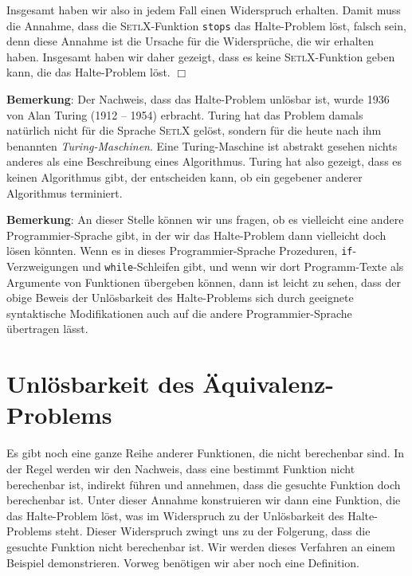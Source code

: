 Insgesamt haben wir also in jedem Fall einen Widerspruch erhalten.  
Damit muss die Annahme, dass die \textsc{SetlX}-Funktion \texttt{stops}
das Halte-Problem l\"{o}st, falsch sein, denn diese Annahme ist die Ursache f\"{u}r die Widerspr\"{u}che, die
wir erhalten haben.  Insgesamt haben wir daher gezeigt, dass es keine \textsc{SetlX}-Funktion
geben kann, die das Halte-Problem l\"{o}st. \hspace*{\fill} $\Box$
\vspace*{0.3cm}

\noindent
\textbf{Bemerkung}:
Der Nachweis, dass das Halte-Problem unl\"{o}sbar ist, wurde 1936 von Alan Turing (1912 -- 1954)
\cite{turing:36} erbracht.  Turing hat das Problem damals nat\"{u}rlich nicht f\"{u}r die Sprache
\textsc{SetlX} gel\"{o}st, sondern f\"{u}r die heute nach ihm benannten \emph{Turing-Maschinen}.  
Eine Turing-Maschine ist abstrakt gesehen nichts anderes als eine Beschreibung eines
Algorithmus.  Turing hat also gezeigt, dass es keinen Algorithmus gibt, der entscheiden
kann, ob ein gegebener anderer Algorithmus terminiert.
\vspace*{0.3cm}

\noindent
\textbf{Bemerkung}:
An dieser Stelle k\"{o}nnen wir uns fragen, ob es vielleicht eine andere Programmier-Sprache
gibt, in der wir das Halte-Problem dann vielleicht doch l\"{o}sen k\"{o}nnten.  
Wenn es in dieses Programmier-Sprache Prozeduren, \texttt{if}-Verzweigungen und
\texttt{while}-Schleifen gibt, und wenn wir dort 
Programm-Texte als Argumente von Funktionen \"{u}bergeben k\"{o}nnen, dann ist leicht zu sehen,
dass der obige Beweis der 
Unl\"{o}sbarkeit des Halte-Problems sich durch geeignete syntaktische Modifikationen auch auf
die andere Programmier-Sprache \"{u}bertragen l\"{a}sst.


\section{Unl\"{o}sbarkeit des \"{A}quivalenz-Problems}
Es gibt noch eine ganze Reihe anderer Funktionen, die nicht berechenbar sind.  In der
Regel werden wir den Nachweis, dass eine bestimmt Funktion nicht berechenbar ist, indirekt f\"{u}hren
und annehmen, dass die gesuchte Funktion doch berechenbar ist.  Unter dieser Annahme
konstruieren wir dann eine Funktion, die das Halte-Problem l\"{o}st, was im Widerspruch zu der Unl\"{o}sbarkeit
des Halte-Problems steht.
Dieser Widerspruch zwingt uns zu der Folgerung, dass die gesuchte Funktion nicht berechenbar ist.
Wir werden dieses Verfahren an einem Beispiel demonstrieren.  Vorweg ben\"{o}tigen wir aber
noch eine Definition.

